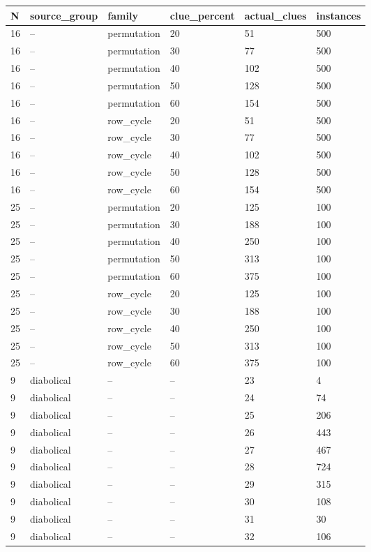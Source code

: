 \begin{tabular}{llllll}
\hline
N & source\_group & family & clue\_percent & actual\_clues & instances \\
\hline
16 & -- & permutation & 20 & 51 & 500 \\
16 & -- & permutation & 30 & 77 & 500 \\
16 & -- & permutation & 40 & 102 & 500 \\
16 & -- & permutation & 50 & 128 & 500 \\
16 & -- & permutation & 60 & 154 & 500 \\
16 & -- & row\_cycle & 20 & 51 & 500 \\
16 & -- & row\_cycle & 30 & 77 & 500 \\
16 & -- & row\_cycle & 40 & 102 & 500 \\
16 & -- & row\_cycle & 50 & 128 & 500 \\
16 & -- & row\_cycle & 60 & 154 & 500 \\
25 & -- & permutation & 20 & 125 & 100 \\
25 & -- & permutation & 30 & 188 & 100 \\
25 & -- & permutation & 40 & 250 & 100 \\
25 & -- & permutation & 50 & 313 & 100 \\
25 & -- & permutation & 60 & 375 & 100 \\
25 & -- & row\_cycle & 20 & 125 & 100 \\
25 & -- & row\_cycle & 30 & 188 & 100 \\
25 & -- & row\_cycle & 40 & 250 & 100 \\
25 & -- & row\_cycle & 50 & 313 & 100 \\
25 & -- & row\_cycle & 60 & 375 & 100 \\
9 & diabolical & -- & -- & 23 & 4 \\
9 & diabolical & -- & -- & 24 & 74 \\
9 & diabolical & -- & -- & 25 & 206 \\
9 & diabolical & -- & -- & 26 & 443 \\
9 & diabolical & -- & -- & 27 & 467 \\
9 & diabolical & -- & -- & 28 & 724 \\
9 & diabolical & -- & -- & 29 & 315 \\
9 & diabolical & -- & -- & 30 & 108 \\
9 & diabolical & -- & -- & 31 & 30 \\
9 & diabolical & -- & -- & 32 & 106 \\

\end{tabular}
